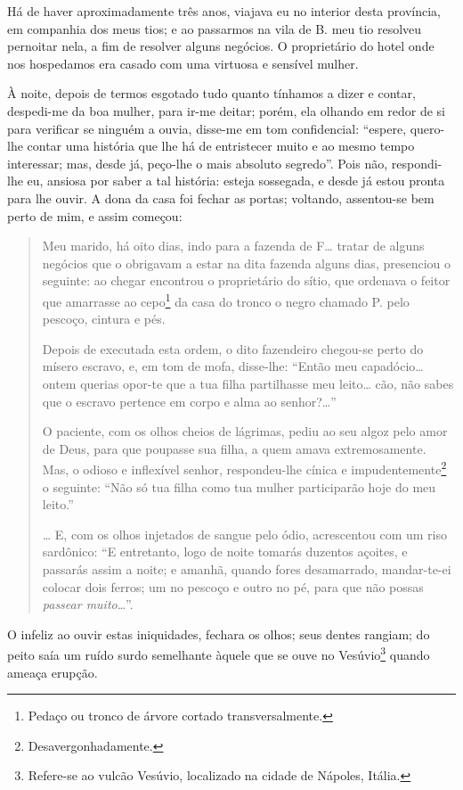 {Há de haver aproximadamente três anos, viajava eu no interior desta
província, em companhia dos meus tios; e ao passarmos na vila de B. meu
tio resolveu pernoitar nela, a fim de resolver alguns negócios. O
proprietário do hotel onde nos hospedamos era casado com uma virtuosa e
sensível mulher.

À noite, depois de termos esgotado tudo quanto tínhamos a dizer e
contar, despedi-me da boa mulher, para ir-me deitar; porém, ela olhando
em redor de si para verificar se ninguém a ouvia, disse-me em tom
confidencial: ``espere, quero-lhe contar uma história que lhe há de
entristecer muito e ao mesmo tempo interessar; mas, desde já, peço-lhe o
mais absoluto segredo''. Pois não, respondi-lhe eu, ansiosa por saber a
tal história: esteja sossegada, e desde já estou pronta para lhe ouvir.
A dona da casa foi fechar as portas; voltando, assentou-se bem perto de
mim, e assim começou:

\begin{quote}
Meu marido, há oito dias, indo para a fazenda de F\ldots{} tratar de alguns
negócios que o obrigavam a estar na dita fazenda alguns dias, presenciou
o seguinte: ao chegar encontrou o proprietário do sítio, que ordenava o
feitor que amarrasse ao cepo\footnote{Pedaço ou tronco de árvore
  cortado transversalmente.} da casa do tronco o negro chamado P. pelo
pescoço, cintura e pés.

Depois de executada esta ordem, o dito fazendeiro chegou-se perto do
mísero escravo, e, em tom de mofa, disse-lhe: ``Então meu capadócio\ldots{}
ontem querias opor-te que a tua filha partilhasse meu leito\ldots{} cão, não
sabes que o escravo pertence em corpo e alma ao senhor?\ldots{}''

O paciente, com os olhos cheios de lágrimas, pediu ao seu algoz pelo
amor de Deus, para que poupasse sua filha, a quem amava extremosamente.
Mas, o odioso e inflexível senhor, respondeu-lhe cínica e
impudentemente\footnote{Desavergonhadamente.} o seguinte: ``Não só tua
filha como tua mulher participarão hoje do meu leito.''

\ldots{} E, com os olhos injetados de sangue pelo ódio, acrescentou com um
riso sardônico: ``E entretanto, logo de noite tomarás duzentos açoites, e
passarás assim a noite; e amanhã, quando fores desamarrado, mandar-te-ei
colocar dois ferros; um no pescoço e outro no pé, para que não possas
\emph{passear muito}\ldots{}''.
\end{quote}

O infeliz ao ouvir estas iniquidades, fechara os olhos; seus dentes
rangiam; do peito saía um ruído surdo semelhante àquele que se ouve no
Vesúvio\footnote{Refere-se ao vulcão Vesúvio, localizado na cidade de
  Nápoles, Itália.} quando ameaça erupção.

}

